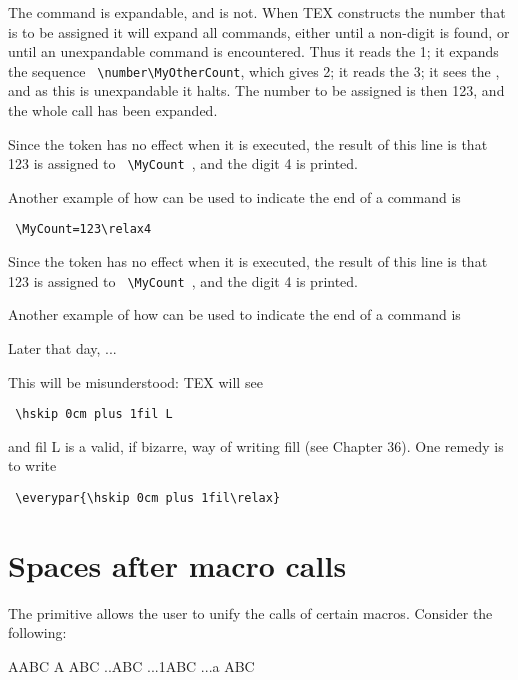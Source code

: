 The command \cmd{\number} is expandable, and \cmd{\relax} is not. When TEX constructs the number that is
to be assigned it will expand all commands, either until a non-digit is found, or until an unexpandable
command is encountered. Thus it reads the 1; it expands the sequence \verb+ \number\MyOtherCount+,
which gives 2; it reads the 3; it sees the \cmd{\relax}, and as this is unexpandable it halts. The number
to be assigned is then 123, and the whole call has been expanded.


\noindent Since the \cmd{\relax} token has no effect when it is executed, the result of this line is that 123 is
assigned to \verb+ \MyCount +, and the digit 4 is printed.



Another example of how \cmd{\relax} can be used to indicate the end of a command is

\verb+ \MyCount=123\relax4+

\begin{codeexample}[]
\newcount\MyCount
{}\par
\the\MyCount
\end{codeexample}

\noindent Since the  token has no effect when it is executed, the result of this line is that 123 is
assigned to \verb+ \MyCount +, and the digit 4 is printed.

Another example of how  can be used to indicate the end of a command is


\begin{teX}
\indent Later that day, ...
\end{teX}

\noindent This will be misunderstood: TEX will see

\verb+ \hskip 0cm plus 1fil L+

\noindent and fil L is a valid, if bizarre, way of writing fill (see Chapter 36). One remedy is to write

\verb+ \everypar{\hskip 0cm plus 1fil\relax}+

\section{Spaces after macro calls}

\cmd{\ignorespaces}
The primitive \cmd{\ignorespaces} allows the user to unify the calls of certain macros. Consider the following:

\begin{codeexample}[]
\bgroup
\def\\{A}
\def\xx{..}
\def\yy{...}

\\ABC
\\ ABC
\xx ABC
\yy{1}ABC
\yy{a} ABC
\egroup
\end{codeexample}

